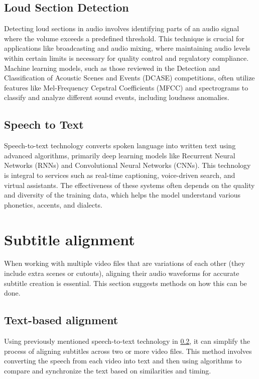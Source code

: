 \subsection{Loud Section Detection}
Detecting loud sections in audio involves identifying parts of an audio signal where the volume exceeds a predefined threshold. This technique is crucial for applications like broadcasting and audio mixing, where maintaining audio levels within certain limits is necessary for quality control and regulatory compliance. Machine learning models, such as those reviewed in the Detection and Classification of Acoustic Scenes and Events (DCASE) competitions, often utilize features like Mel-Frequency Cepstral Coefficients (MFCC) and spectrograms to classify and analyze different sound events, including loudness anomalies.

\subsection{Speech to Text}
\label{theory:speech-to-text}
Speech-to-text technology converts spoken language into written text using advanced algorithms, primarily deep learning models like Recurrent Neural Networks (RNNs) and Convolutional Neural Networks (CNNs). This technology is integral to services such as real-time captioning, voice-driven search, and virtual assistants. The effectiveness of these systems often depends on the quality and diversity of the training data, which helps the model understand various phonetics, accents, and dialects.

\section{Subtitle alignment}

When working with multiple video files that are variations of each other (they include extra scenes or cutouts), aligning their audio waveforms for accurate subtitle creation is essential. This section suggests methods on how this can be done.

\subsection{Text-based alignment}

Using previously mentioned speech-to-text technology in \ref{theory:speech-to-text}, it can simplify the process of aligning subtitles across two or more video files. This method involves converting the speech from each video into text and then using algorithms to compare and synchronize the text based on similarities and timing.

